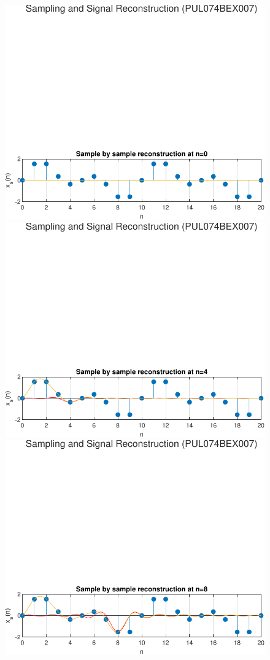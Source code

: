 \documentclass{lab_sheet}
\begin{document}
\begin{figure}[H]
    \centering
    \includegraphics[width=0.8\linewidth]{../Figures/s_2}
    \includegraphics[width=0.8\linewidth]{../Figures/s_3}
    \includegraphics[width=0.8\linewidth]{../Figures/s_4}

\end{figure}
\end{document}
